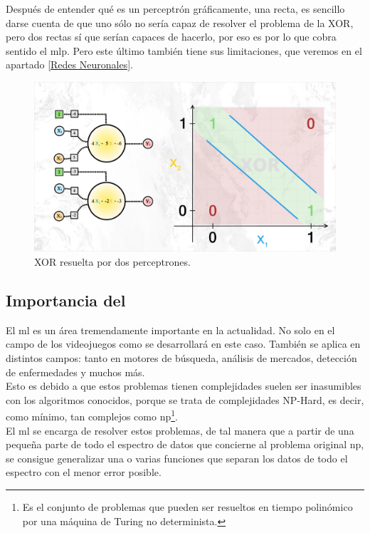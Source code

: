 Después de entender qué es un perceptrón gráficamente, una recta, es sencillo darse cuenta de que uno sólo no sería capaz de resolver el problema de la XOR, pero dos rectas sí que serían capaces de hacerlo, por eso es por lo que cobra sentido el \gls{mlp}. Pero este último también tiene sus limitaciones, que veremos en el apartado \ref{Redes Neuronales}.

\begin{figure}[h]
	\centering
	\includegraphics[width=15cm]{archivos/imagenes/problema-xor-resuelto.png}
	\caption[XOR resuelta por dos perceptrones.]{XOR resuelta por dos perceptrones\footnotemark.}
\end{figure}

\subsection{Importancia del }
\label{importancia ml}
El \gls{ml} es un área tremendamente importante en la actualidad. No solo en el campo de los videojuegos como se desarrollará en este caso. También se aplica en distintos campos: tanto en motores de búsqueda, análisis de mercados, detección de enfermedades y muchos más. 
\\
Esto es debido a que estos problemas tienen complejidades suelen ser inasumibles con los algoritmos conocidos, porque se trata de complejidades NP-Hard, es decir, como mínimo, tan complejos como \gls{np}\footnote{Es el conjunto de problemas que pueden ser resueltos en tiempo polinómico por una máquina de Turing no determinista.}. 
\\
El \gls{ml} se encarga de resolver estos problemas, de tal manera que a partir de una pequeña parte de todo el espectro de datos que concierne al problema original \gls{np}, se consigue generalizar una o varias funciones que separan los datos de todo el espectro con el menor error posible.

